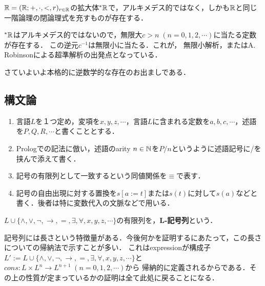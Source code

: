 \documentclass[uplatex, dvipdfmx]{jsreport}
\begin{document}
\begin{example}[代数的閉体]
    
\end{example}

\begin{example}[実数]
    \begin{proposition}[Compactness]
        $\mathbb{R}=(\mathbb{R};+,\cdot,<,r)_{r\in\mathbb{R}}$の拡大体${}^*\mathbb{R}$で，アルキメデス的ではなく，しかも$\mathbb{R}$と同じ一階論理の閉論理式を充すものが存在する．
    \end{proposition}
    \begin{remark}
        ${}^*\mathbb{R}$はアルキメデス的ではないので，無限大$c>n\;(n=0,1,2,\cdots)$に当たる定数が存在する．
        この逆元$c^{-1}$は無限小に当たる．これが，
        無限小解析，またはA. Robinsonによる超準解析の出発点となっている．
    \end{remark}
\end{example}

さていよいよ本格的に逆数学的な存在のお出ましである．

\begin{example}[実閉体]
    
\end{example}

\subsection{構文論}

\begin{notation}\mbox{}
    \begin{enumerate}
        \item 言語$L$を１つ定め，変項を$x,y,z,\cdots$，言語$L$に含まれる定数を$a,b,c,\cdots$，述語を$P,Q,R,\cdots$と書くこととする．
        \item Prologでの記法に倣い，述語のarity $n\in\mathbb{N}$を$P/n$というように述語記号に/を挟んで添えて書く．
        \item 記号の有限列として一致するという同値関係を$\equiv$で表す．
        \item 記号の自由出現に対する置換を$s[a:=t]$または$s(t)$に対して$s(a)$などと書く．後者は特に変数代入の文脈などで用いる．
    \end{enumerate}
\end{notation}

\begin{definition}[expression]
    $L\cup\{\land,\lor,\lnot,\to,=,\exists,\forall,x,y,z,\cdots\}$の有限列を，\textbf{L-記号列}という．
\end{definition}
\begin{remark}
    記号列には長さという特徴量がある．今後何かを証明するにあたって，この長さについての帰納法で示すことが多い．
    これはexpressionが構成子$L':=L\cup\{\land,\lor,\lnot,\to,=,\exists,\forall,x,y,z,\cdots\}$と$cons:L\times L^n\to L^{n+1}\;(n=0,1,2,\cdots)$から
    帰納的に定義されるからである．その上の性質が定まっているかの証明は全て此処に戻ることになる．
\end{remark}
\end{document}
